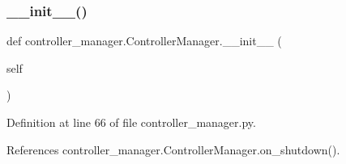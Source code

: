 \subsubsection{\texorpdfstring{\+\_\+\+\_\+init\+\_\+\+\_\+()}{\_\_init\_\_()}}
{\footnotesize\ttfamily def controller\+\_\+manager.\+Controller\+Manager.\+\_\+\+\_\+init\+\_\+\+\_\+ (\begin{DoxyParamCaption}\item[{}]{self }\end{DoxyParamCaption})}



Definition at line 66 of file controller\+\_\+manager.\+py.



References controller\+\_\+manager.\+Controller\+Manager.\+on\+\_\+shutdown().


